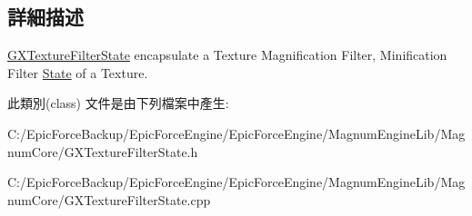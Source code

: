 \subsection{詳細描述}
\hyperlink{class_magnum_1_1_g_x_texture_filter_state}{G\+X\+Texture\+Filter\+State} encapsulate a Texture Magnification Filter, Minification Filter \hyperlink{class_magnum_1_1_state}{State} of a Texture. 

此類別(class) 文件是由下列檔案中產生\+:\begin{DoxyCompactItemize}
\item 
C\+:/\+Epic\+Force\+Backup/\+Epic\+Force\+Engine/\+Epic\+Force\+Engine/\+Magnum\+Engine\+Lib/\+Magnum\+Core/G\+X\+Texture\+Filter\+State.\+h\item 
C\+:/\+Epic\+Force\+Backup/\+Epic\+Force\+Engine/\+Epic\+Force\+Engine/\+Magnum\+Engine\+Lib/\+Magnum\+Core/G\+X\+Texture\+Filter\+State.\+cpp\end{DoxyCompactItemize}
